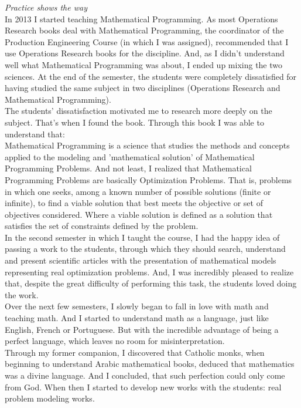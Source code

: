 \documentclass{book}
\begin{document}
\emph{Practice shows the way} \\

In 2013 I started teaching Mathematical Programming. As most Operations Research books deal with Mathematical Programming, the coordinator of the Production Engineering Course (in which I was assigned), recommended that I use Operations Research books for the discipline. And, as I didn't understand well what Mathematical Programming was about, I ended up mixing the two sciences. At the end of the semester, the students were completely dissatisfied for having studied the same subject in two disciplines (Operations Research and Mathematical Programming). \\

The students' dissatisfaction motivated me to research more deeply on the subject. That's when I found the book. Through this book I was able to understand that: \\

Mathematical Programming is a science that studies the methods and concepts applied to the modeling and 'mathematical solution' of Mathematical Programming Problems. And not least, I realized that Mathematical Programming Problems are basically Optimization Problems. That is, problems in which one seeks, among a known number of possible solutions (finite or infinite), to find a viable solution that best meets the objective or set of objectives considered. Where a viable solution is defined as a solution that satisfies the set of constraints defined by the problem. \\

In the second semester in which I taught the course, I had the happy idea of passing a work to the students, through which they should search, understand and present scientific articles with the presentation of mathematical models representing real optimization problems. And, I was incredibly pleased to realize that, despite the great difficulty of performing this task, the students loved doing the work. \\

Over the next few semesters, I slowly began to fall in love with math and teaching math. And I started to understand math as a language, just like English, French or Portuguese. But with the incredible advantage of being a perfect language, which leaves no room for misinterpretation. \\

Through my former companion, I discovered that Catholic monks, when beginning to understand Arabic mathematical books, deduced that mathematics was a divine language. And I concluded, that such perfection could only come from God. When then I started to develop new works with the students: real problem modeling works. \\
\end{document}
